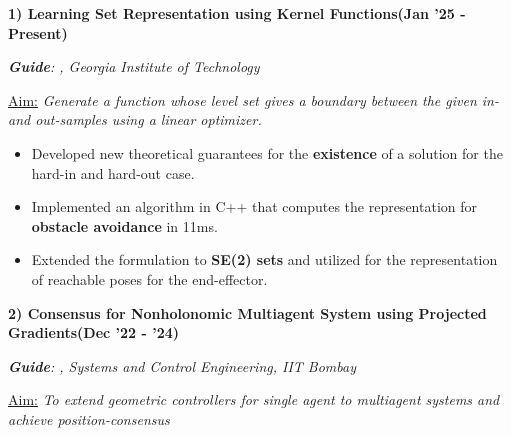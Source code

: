 \documentclass[10pt,letterpaper,sans]{moderncv}        %
\newcommand\x{1}
\newcommand\y{4}
\begin{document}

\textbf{1) Learning Set Representation using Kernel Functions}\hfill{\textbf{(Jan '25 - Present)}}

\textit{\textbf{Guide}: , Georgia Institute of Technology} 

\vspace{\x pt}
\textcolor{mygray}{
\underline{Aim:}
\textit{Generate a function whose level set gives a boundary between the given in- and out-samples using a linear optimizer.}
}\vspace{\x pt}
\begin{itemize}
    \item Developed new theoretical guarantees for the \textbf{existence} of a solution for the hard-in and hard-out case.
    \item Implemented an algorithm in C++ that computes the representation for \textbf{obstacle avoidance} in 11ms.
    \item Extended the formulation to \textbf{SE(2) sets} and utilized for the representation of reachable poses for the end-effector.
\end{itemize}
\hrulefill{}
\vspace{\y pt}


\textbf{2) Consensus for Nonholonomic Multiagent System using Projected Gradients}\hfill{\textbf{(Dec '22 - '24)}}

\textit{\textbf{Guide}: , Systems and Control Engineering, IIT Bombay}


\textcolor{mygray}{
\underline{Aim:} \textit{%
To extend geometric controllers for single agent to multiagent systems and achieve position-consensus}
}\vspace{\x pt}%
\end{document}
